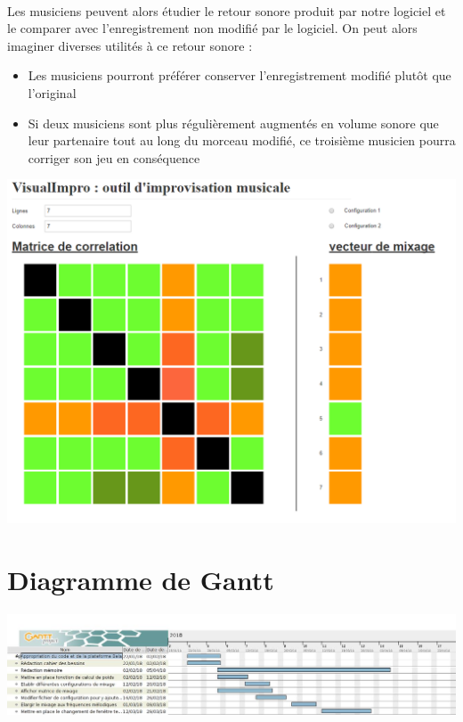 \documentclass{article}
\begin{document}
\paragraph{}
Les musiciens peuvent alors étudier le retour sonore produit par notre logiciel
et le comparer avec l'enregistrement non modifié par le logiciel. On peut
alors imaginer diverses utilités à ce retour sonore :
\begin{itemize}
	\item Les musiciens pourront préférer conserver l'enregistrement modifié plutôt
	      que l'original
	\item Si deux musiciens sont plus régulièrement augmentés en volume sonore que
	      leur partenaire tout au long du morceau modifié, ce troisième musicien pourra
	      corriger son jeu en conséquence
\end{itemize}

\includegraphics[scale=0.10]{proto_2.png}
\section{Diagramme de Gantt}
\includegraphics[scale=0.35]{DiagrammeAnalyseBesoins.jpg}

\end{document}
